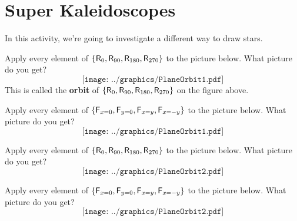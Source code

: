 \newpage
\section{Super Kaleidoscopes}

In this activity, we're going to investigate a different way to draw
stars.

\begin{prob}
Apply every element of
$\{\mathsf{R}_{0},\mathsf{R}_{90},\mathsf{R}_{180},\mathsf{R}_{270}\}$ to the
picture below. What picture do you get?
\[
\texttt{[image: ../graphics/PlaneOrbit1.pdf]}
\]
This is called the \textbf{orbit} of
$\{\mathsf{R}_{0},\mathsf{R}_{90},\mathsf{R}_{180},\mathsf{R}_{270}\}$ on the
figure above.
\end{prob}

\vfill

\break

\begin{prob}
Apply every element of $\{\mathsf{F}_{x=0}, \mathsf{F}_{y=0}, \mathsf{F}_{x=y},\mathsf{F}_{x=-y}\}$ to the picture below. What picture do
you get?
\[
\texttt{[image: ../graphics/PlaneOrbit1.pdf]}
\]
\end{prob}

\vfill

\break

\begin{prob}
Apply every element of $\{\mathsf{R}_{0},\mathsf{R}_{90},\mathsf{R}_{180},\mathsf{R}_{270}\}$ to the picture below. What picture do
you get?
\[
\texttt{[image: ../graphics/PlaneOrbit2.pdf]}
\]
\end{prob}

\vfill

\break

\begin{prob}
Apply every element of
$\{\mathsf{F}_{x=0}, \mathsf{F}_{y=0}, \mathsf{F}_{x=y},\mathsf{F}_{x=-y}\}$ to
the picture below. What picture do you get?
\[
\texttt{[image: ../graphics/PlaneOrbit2.pdf]}
\]
\end{prob}

\vfill


